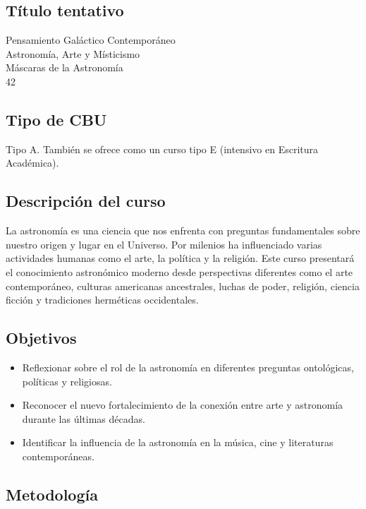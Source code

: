 \documentclass{report}
\begin{document}
\subsection*{\bf T\'itulo tentativo}
Pensamiento Gal\'actico Contempor\'aneo\\
Astronom\'ia, Arte y M\'isticismo\\
M\'ascaras de la Astronom\'ia\\
42\\

\subsection*{Tipo de CBU}
Tipo A. Tambi\'en se ofrece como un curso tipo E (intensivo en
Escritura Acad\'emica). 


\subsection*{Descripci\'on del curso}
La astronom\'ia es una ciencia que nos enfrenta con preguntas
fundamentales sobre nuestro origen y lugar en el Universo. Por
milenios ha influenciado varias actividades humanas como el arte, la
pol\'itica y la religi\'on. Este curso presentar\'a el conocimiento
astron\'omico moderno desde perspectivas diferentes como el arte
contempor\'aneo, culturas americanas ancestrales, luchas de poder,
religi\'on, ciencia ficci\'on y tradiciones herm\'eticas occidentales.  

\subsection*{Objetivos}

\begin{itemize}
\item Reflexionar sobre el rol de la astronom\'ia en diferentes
  preguntas ontol\'ogicas, pol\'iticas y religiosas. 
\item Reconocer el nuevo fortalecimiento de la conexi\'on entre arte y
  astronom\'ia durante las \'ultimas d\'ecadas.
\item Identificar la influencia de la astronom\'ia en la m\'usica,
  cine y literaturas contempor\'aneas.
\end{itemize}

\subsection*{Metodolog\'ia}
\end{document}
